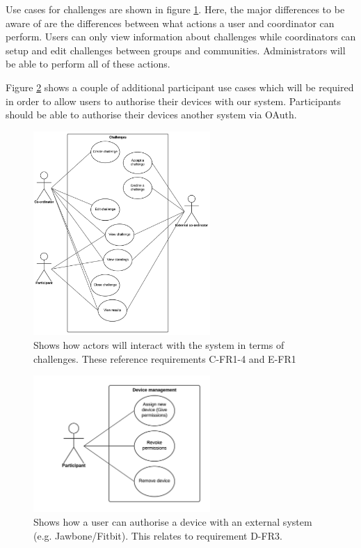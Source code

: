 Use cases for challenges are shown in figure \ref{fig:use-case-challenges}. Here, the major differences to be aware of are the differences between what actions a user and coordinator can perform. Users can only view information about challenges while coordinators can setup and edit challenges between groups and communities. Administrators will be able to perform all of these actions.

Figure \ref{fig:use-case-assigning-devices} shows a couple of additional participant use cases which will be required in order to allow users to authorise their devices with our system. Participants should be able to authorise their devices another system via OAuth.


\begin{figure}[H]
\centering
\includegraphics[width=0.6\textwidth]{../design/UML/UseCase/Challenges.png}
\caption{Shows how actors will interact with the system in terms of challenges. These reference requirements C-FR1-4 and E-FR1}
\label{fig:use-case-challenges}
\end{figure}

\begin{figure}[H]
\centering
\includegraphics[width=0.6\textwidth]{../design/UML/UseCase/Assigning-Devices.png}
\caption{Shows how a user can authorise a device with an external system (e.g. Jawbone/Fitbit). This relates to requirement D-FR3.}
\label{fig:use-case-assigning-devices}
\end{figure}

